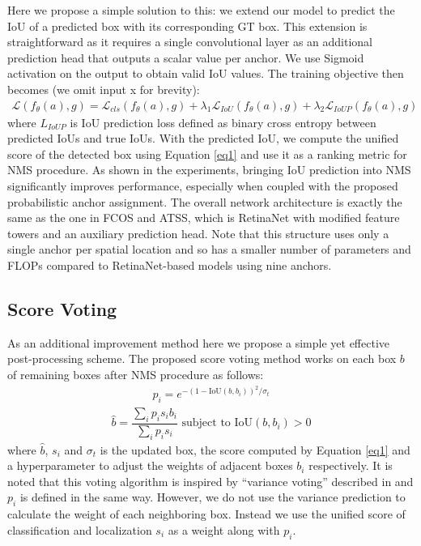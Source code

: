 \documentclass[runningheads]{llncs}
\begin{document}
Here we propose a simple solution to this: we extend our model to predict the IoU of a predicted box with its corresponding GT box. This extension is straightforward as it requires a single convolutional layer as an additional prediction head that outputs a scalar value per anchor. We use Sigmoid activation on the output to obtain valid IoU values. The training objective then becomes (we omit input x for brevity):
\begin{align}
    \mathcal{L}(f_{\theta}(a), g) = \mathcal{L}_{cls}(f_{\theta}(a), g) + \lambda_1\mathcal{L}_{IoU}(f_{\theta}(a), g) + \lambda_2\mathcal{L}_{IoUP}(f_{\theta}(a), g)
\label{eq:loss}
\end{align}
where ${L}_{IoUP}$ is IoU prediction loss defined as binary cross entropy between predicted IoUs and true IoUs. With the predicted IoU, we compute the unified score of the detected box using Equation \ref{eq1} and use it as a ranking metric for NMS procedure. As shown in the experiments, bringing IoU prediction into NMS significantly improves performance, especially when coupled with the proposed probabilistic anchor assignment. The overall network architecture is exactly the same as the one in FCOS\cite{fcos} and ATSS\cite{atss}, which is RetinaNet with modified feature towers and an auxiliary prediction head. Note that this structure uses only a single anchor per spatial location and so has a smaller number of parameters and FLOPs compared to RetinaNet-based models using nine anchors.

\subsection{Score Voting}
As an additional improvement method here we propose a simple yet effective post-processing scheme. The proposed score voting method works on each box $b$ of remaining boxes after NMS procedure as follows:
\begin{equation}
    \begin{split}
        p_i = e^{-(1-\text{IoU}(b, b_i))^2/\sigma_t}
    \end{split}
\end{equation}
\begin{equation}
    \begin{split}
        \hat{b}=\dfrac{\sum_ip_is_ib_i}{\sum_ip_is_i} \text{ subject to IoU}(b, b_i) > 0
    \end{split}
\end{equation}
where $\hat{b}$, $s_i$ and $\sigma_t$ is the updated box, the score computed by Equation \ref{eq1} and a hyperparameter to adjust the weights of adjacent boxes $b_i$ respectively. It is noted that this voting algorithm is inspired by ``variance voting'' described in \cite{varvoting} and $p_i$ is defined in the same way. However, we do not use the variance prediction to calculate the weight of each neighboring box. Instead we use the unified score of classification and localization $s_i$ as a weight along with $p_i$.
\end{document}
